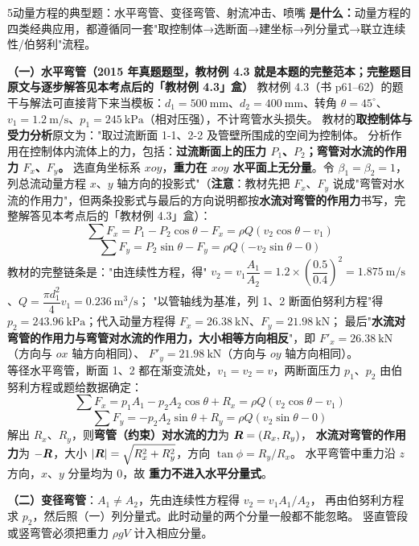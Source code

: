 \begin{kaodian}{5}{动量方程的典型题：水平弯管、变径弯管、射流冲击、喷嘴}
\textbf{是什么：}动量方程的四类经典应用，都遵循同一套"取控制体→选断面→建坐标→列分量式→联立连续性/伯努利"流程。

\textbf{（一）水平弯管（2015 年真题题型，\textbf{教材例 4.3} 就是本题的完整范本；\textbf{完整题目原文与逐步解答见本考点后的「教材例 4.3」盒}）}
教材例 4.3（书 p61--62）的题干与解法可直接背下来当模板：$d_1=500\ \mathrm{mm}$、$d_2=400\ \mathrm{mm}$、转角 $\theta=45^{\circ}$、
$v_1=1.2\ \mathrm{m/s}$、$p_1=245\ \mathrm{kPa}$（相对压强），不计弯管水头损失。
教材的\textbf{取控制体与受力分析}原文为："取过流断面 1-1、2-2 及管壁所围成的空间为控制体。
分析作用在控制体内流体上的力，包括：\textbf{过流断面上的压力 $P_1$、$P_2$；弯管对水流的作用力 $F_x$、$F_y$。}
选直角坐标系 $xoy$，\textbf{重力在 $xoy$ 水平面上无分量}。令 $\beta_1=\beta_2=1$，列总流动量方程 $x$、$y$ 轴方向的投影式"（\textbf{注意}：教材先把 $F_x$、$F_y$ 说成"弯管对水流的作用力"，但两条投影式与最后的方向说明都按\textbf{水流对弯管的作用力}书写，完整解答见本考点后的「教材例 4.3」盒）：
\[ \sum F_x=P_1-P_2\cos\theta-F_x=\rho Q\left(v_2\cos\theta-v_1\right) \]
\[ \sum F_y=P_2\sin\theta-F_y=\rho Q\left(-v_2\sin\theta-0\right) \]
教材的完整链条是："由连续性方程，得" $v_2=v_1\dfrac{A_1}{A_2}=1.2\times\left(\dfrac{0.5}{0.4}\right)^2=1.875\ \mathrm{m/s}$、$Q=\dfrac{\pi d_1^2}{4}v_1=0.236\ \mathrm{m^3/s}$；
"以管轴线为基准，列 1、2 断面伯努利方程"得 $p_2=243.96\ \mathrm{kPa}$；代入动量方程得 $F_x=26.38\ \mathrm{kN}$、$F_y=21.98\ \mathrm{kN}$；
最后"\textbf{水流对弯管的作用力与弯管对水流的作用力，大小相等方向相反}"，即 $F'_x=26.38\ \mathrm{kN}$（方向与 $ox$ 轴方向相同）、
$F'_y=21.98\ \mathrm{kN}$（方向与 $oy$ 轴方向相同）。\\
等径水平弯管，断面 1、2 都在渐变流处，$v_1=v_2=v$，两断面压力 $p_1$、$p_2$ 由伯努利方程或题给数据确定：
\[
\sum F_x=p_1A_1-p_2A_2\cos\theta+R_x=\rho Q\left(v_2\cos\theta-v_1\right)
\]
\[
\sum F_y=-p_2A_2\sin\theta+R_y=\rho Q\left(v_2\sin\theta-0\right)
\]
解出 $R_x$、$R_y$，则\textbf{弯管（约束）对水流的力}为 $\bm{R}=(R_x,R_y)$，
\textbf{水流对弯管的作用力}为 $-\bm{R}$，大小 $|\bm{R}|=\sqrt{R_x^2+R_y^2}$，方向 $\tan\phi=R_y/R_x$。
水平弯管中重力沿 $z$ 方向，$x$、$y$ 分量均为 0，故 \textbf{重力不进入水平分量式}。

\textbf{（二）变径弯管}：$A_1\ne A_2$，先由连续性方程得 $v_2=v_1A_1/A_2$，
再由伯努利方程求 $p_2$，然后照（一）列分量式。此时动量的两个分量一般都不能忽略。
竖直管段或竖弯管必须把重力 $\rho gV$ 计入相应分量。


\end{kaodian}
